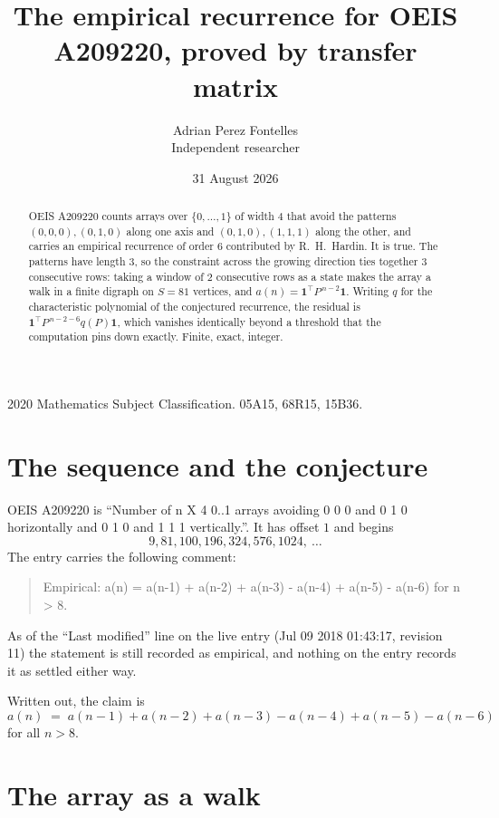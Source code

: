 \documentclass[11pt,a4paper]{article}
\title{The empirical recurrence for OEIS A209220, proved by transfer matrix}
\author{Adrian Perez Fontelles\\ \small Independent researcher}
\date{31 August 2026}
\theoremstyle{plain}
\theoremstyle{definition}
\begin{document}
\maketitle

\begin{abstract}
OEIS A209220 counts arrays over $\{0,\dots,1\}$ of width $4$ that avoid the patterns
$(0,0,0), (0,1,0)$ along one axis and $(0,1,0), (1,1,1)$ along the other, and carries an empirical recurrence of
order $6$ contributed by R.~H.~Hardin. It is true. The patterns have length $3$, so
the constraint across the growing direction ties together $3$ consecutive rows: taking a
window of $2$ consecutive rows as a state makes the array a walk in a finite digraph
on $S=81$ vertices, and $a(n)=\mathbf{1}^{\!\top}P^{\,n-2}\mathbf{1}$. Writing $q$
for the characteristic polynomial of the conjectured recurrence, the residual is
$\mathbf{1}^{\!\top}P^{\,n-2-6}q(P)\mathbf{1}$, which vanishes identically
beyond a threshold that the computation pins down exactly. Finite, exact, integer.
\end{abstract}

\noindent\small 2020 Mathematics Subject Classification. 05A15, 68R15, 15B36.\normalsize

\section{The sequence and the conjecture}

OEIS A209220 is ``Number of n X 4 0..1 arrays avoiding 0 0 0 and 0 1 0 horizontally and 0 1 0 and 1 1 1 vertically.''. It has offset
$1$ and begins
\[
9, 81, 100, 196, 324, 576, 1024,\ \dots
\]
The entry carries the following comment:
\begin{quote}\small
Empirical: a(n) = a(n-1) + a(n-2) + a(n-3) - a(n-4) + a(n-5) - a(n-6) for n > 8.
\end{quote}
As of the ``Last modified'' line on the live entry (Jul 09 2018 01:43:17, revision
11) the statement is still recorded as empirical, and nothing on the entry
records it as settled either way.

Written out, the claim is
\begin{equation}\label{eq:conj}
a(n)\;=\;a(n-1) + a(n-2) + a(n-3) - a(n-4) + a(n-5) - a(n-6)
\end{equation}
for all $n>8$. 

\section{The array as a walk}
\end{document}
